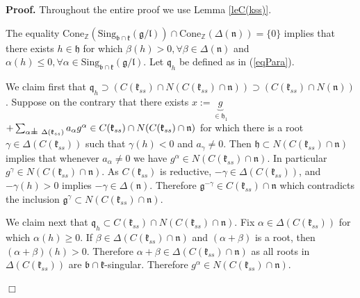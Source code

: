 \documentclass[12pt]{report}
\newenvironment{proof}[1][]{ \textbf{Proof#1. }}{$\Box$\medskip}
\newcommand {\ZZ} {\mathbb {Z}}
\newcommand{\kk}{\mathfrak{k}}
\newcommand{\nn}{\mathfrak{n}}
\newcommand{\hh}{\mathfrak{h}}
\newcommand{\gG}{\mathfrak{g}}
\newcommand{\bb}{\mathfrak{b}}
\newcommand{\lL}{\mathfrak{l}}
\newcommand{\refle}[1]{Lemma \ref{#1}}
\newcommand{\refeq}[1]{(\ref{#1})}
\newcommand{\Cone}{\mathrm{Cone}}
\newcommand{\hw}{\mathrm{Sing}}
\def\sperp{{\hbox{$\perp${\hbox{\kern -.77em $-$}\raise-1pt\hbox{\kern -.77em $-$}}\ }}}
\begin{document}
\begin{proof}
Throughout the entire proof we use \refle{leC(kss)}. 

The equality $\Cone_{\ZZ}(\hw_{\bb\cap\kk}(\gG/\lL))\cap\Cone_{\ZZ}(\Delta(\nn))= \{0\}$ implies that there exists $h\in\hh$ for which $\beta(h) >0, \forall \beta\in\Delta(\nn)$ and $\alpha(h)\leq 0, \forall \alpha\in\hw_{\bb\cap\kk}(\gG/\lL)$. Let $\mathfrak{q}_h$ be defined as in \refeq{eqPara}. 



We claim first that $\mathfrak{q}_h\supset \left(C(\kk_{ss})\cap N(C(\kk_{ss})\cap\nn)\right)\supset \left( C(\kk_{ss} ) \cap N(\nn)\right)$. Suppose on the contrary that there exists $x:=\underbrace{g}_{\in\hh_1}$ $+ \sum_{ \alpha \sperp\Delta (\kk_{ss})} a_{\alpha} g^\alpha\in C(\kk_{ss})\cap N(C(\kk_{ss})\cap\nn)$ for which there is a root $\gamma\in \Delta(C(\kk_{ss}))$ such that $\gamma(h)<0$ and $a_\gamma\neq 0$. Then $\hh\subset N(C(\kk_{ss})\cap\nn)$ implies that whenever $a_\alpha\neq 0$ we have $g^\alpha\in N(C(\kk_{ss})\cap\nn)$. In particular $g^\gamma\in N(C(\kk_{ss})\cap\nn)$. As $C(\kk_{ss})$ is reductive, ${-\gamma} \in\Delta (C(\kk_{ss}))$, and $-\gamma(h)>0$ implies $-\gamma\in\Delta(\nn)$. Therefore $\gG^{-\gamma}\in C(\kk_{ss})\cap\nn$ which contradicts the inclusion $\gG^{\gamma}\subset N(C(\kk_{ss})\cap\nn)$.

We claim next that $\mathfrak{q}_h\subset C(\kk_{ss})\cap N(C(\kk_{ss})\cap\nn)$. Fix $\alpha\in \Delta( C( \kk_{ss} ))$ for which $\alpha(h) \geq 0$. If $\beta\in\Delta(C(\kk_{ss})\cap\nn)$ and $(\alpha+\beta)$ is a root, then $(\alpha+\beta)(h)>0$. Therefore $\alpha + \beta \in \Delta(C(\kk_{ss}) \cap\nn)$ as all roots in $\Delta(C(\kk_{ss}))$ are $\bb\cap\kk$-singular. Therefore $g^{\alpha}\in N(C(\kk_{ss})\cap\nn)$. 


\end{proof}
\end{document}
